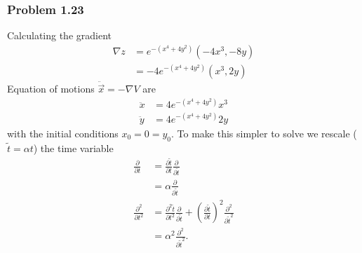 \documentclass[10pt,a4paper]{article}
\theoremstyle{definition}
\begin{document}
\subsubsection{Problem 1.23}
Calculating the gradient
\begin{align}
\nabla z&=e^{-(x^4+4y^2)}(-4x^3,-8y)\\
&=-4e^{-(x^4+4y^2)}(x^3,2y)
\end{align}
Equation of motions $\ddot{\vec{x}}=-\nabla V$ are
\begin{align}
\ddot x&=4e^{-(x^4+4y^2)}x^3\\
\ddot y&=4e^{-(x^4+4y^2)}2y
\end{align}
with the initial conditions $x_0=0=y_0$. To make this simpler to solve we rescale ($\tilde t=\alpha t$) the time variable
\begin{align}
\frac{\partial}{\partial t}
&=\frac{\partial\tilde{t}}{\partial t}\frac{\partial}{\partial \tilde{t}}\\
&=\alpha\frac{\partial}{\partial \tilde{t}}\\
\frac{\partial^2}{\partial t^2}
&=\frac{\partial^2\tilde{t}}{\partial t^2}\frac{\partial}{\partial \tilde{t}}+\left(\frac{\partial\tilde{t}}{\partial t}\right)^2\frac{\partial^2}{\partial {\tilde t}^2}\\
&=\alpha^2\frac{\partial^2}{\partial {\tilde t}^2}.
\end{align}
\end{document}

